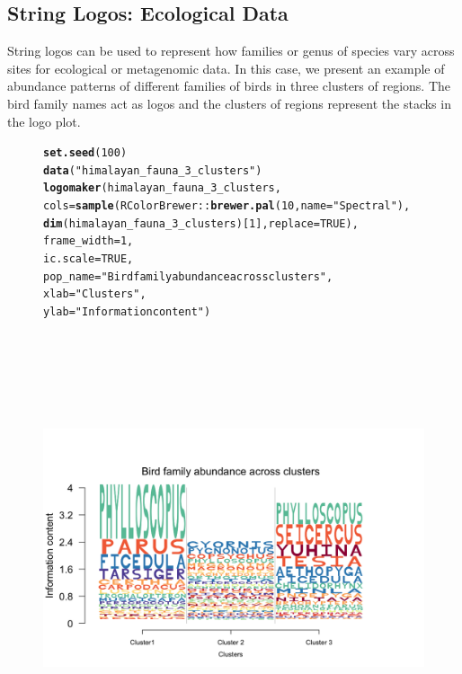 \documentclass[12pt]{article}\usepackage[]{graphicx}\usepackage[usenames,dvipsnames]{color}
\makeatletter
\newcommand{\hlnum}[1]{\textcolor[rgb]{0.686,0.059,0.569}{#1}}%
\newcommand{\hlstr}[1]{\textcolor[rgb]{0.192,0.494,0.8}{#1}}%
\newcommand{\hlopt}[1]{\textcolor[rgb]{0,0,0}{#1}}%
\newcommand{\hlstd}[1]{\textcolor[rgb]{0.345,0.345,0.345}{#1}}%
\newcommand{\hlkwc}[1]{\textcolor[rgb]{0.333,0.667,0.333}{#1}}%
\newcommand{\hlkwd}[1]{\textcolor[rgb]{0.737,0.353,0.396}{\textbf{#1}}}%
\newenvironment{kframe}{%
 \def\at@end@of@kframe{}%
 \ifinner\ifhmode%
  \def\at@end@of@kframe{\end{minipage}}%
  \begin{minipage}{\columnwidth}%
 \fi\fi%
 \def\FrameCommand##1{\hskip\@totalleftmargin \hskip-\fboxsep
 \colorbox{shadecolor}{##1}\hskip-\fboxsep
     \hskip-\linewidth \hskip-\@totalleftmargin \hskip\columnwidth}%
 \MakeFramed {\advance\hsize-\width
   \@totalleftmargin\z@ \linewidth\hsize
   \@setminipage}}%
 {\par\unskip\endMakeFramed%
 \at@end@of@kframe}
\newenvironment{knitrout}{}{} %
\makeatother
\begin{document}
\subsection{String Logos:  Ecological Data}

String logos can be used to represent how families or genus of species vary across sites for ecological or metagenomic data. In this case, we present an example of abundance patterns of different families of birds in three clusters of regions. The bird family names act as logos and the clusters of regions represent the stacks
in the logo plot.

\begin{figure}[h]
\begin{center}
\begin{knitrout}
\color{fgcolor}\begin{kframe}
\begin{alltt}
\hlkwd{set.seed}\hlstd{(}\hlnum{100}\hlstd{)}
\hlkwd{data}\hlstd{(}\hlstr{"himalayan_fauna_3_clusters"}\hlstd{)}
\hlkwd{logomaker}\hlstd{(himalayan_fauna_3_clusters,}
          \hlkwc{cols}\hlstd{=} \hlkwd{sample}\hlstd{(RColorBrewer}\hlopt{::}\hlkwd{brewer.pal}\hlstd{(}\hlnum{10}\hlstd{,}\hlkwc{name} \hlstd{=} \hlstr{"Spectral"}\hlstd{),}
                       \hlkwd{dim}\hlstd{(himalayan_fauna_3_clusters)[}\hlnum{1}\hlstd{],} \hlkwc{replace}\hlstd{=}\hlnum{TRUE}\hlstd{),}
          \hlkwc{frame_width} \hlstd{=} \hlnum{1}\hlstd{,}
          \hlkwc{ic.scale} \hlstd{=} \hlnum{TRUE}\hlstd{,}
          \hlkwc{pop_name} \hlstd{=} \hlstr{"Bird family abundance across clusters"}\hlstd{,}
          \hlkwc{xlab} \hlstd{=} \hlstr{"Clusters"}\hlstd{,}
          \hlkwc{ylab} \hlstd{=} \hlstr{"Information content"}\hlstd{)}
\end{alltt}
\end{kframe}
\includegraphics[width=8in,height=5in]{figure/logolas_use_10-1} 

\end{knitrout}
\end{center}
\end{figure}
\end{document}
